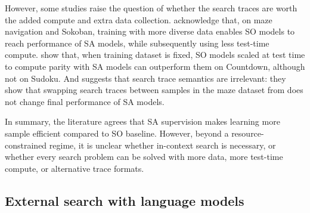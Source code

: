However, some studies raise the question of whether the search traces are worth the added compute and extra data collection.
\citeauthor{lehnertBetterPlanningTransformers2024} acknowledge that, on maze navigation and Sokoban, training with more diverse data enables SO models to reach performance of SA models, while subsequently using less test-time compute.
\citet{qinBacktrackNotBacktrack2025} show that, when training dataset is fixed, SO models scaled at test time to compute parity with SA models can outperform them on Countdown, although not on Sudoku.
And \citet{valmeekamSemanticsUnreasonableEffectiveness2025} suggests that search trace semantics are irrelevant: they show that swapping search traces between samples in the maze dataset from \citeauthor{lehnertBetterPlanningTransformers2024} does not change final performance of SA models.

In summary, the literature agrees that SA supervision makes learning more sample efficient compared to SO baseline.
However, beyond a resource-constrained regime, it is unclear whether in-context search is necessary, or whether every search problem can be solved with more data, more test-time compute, or alternative trace formats.

\subsection{External search with language models}
\label{sec:bg_search_lm_external}

